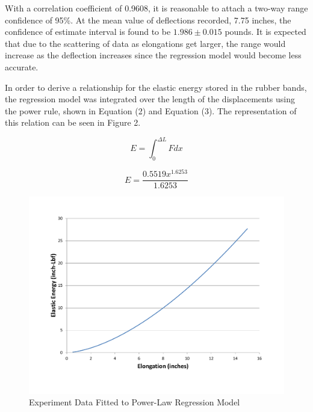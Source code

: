 \documentclass[12pt]{article}
\begin{document}
\bigskip
With a correlation coefficient of 0.9608, it is reasonable to attach a two-way range confidence of 95\%. At the mean value of deflections recorded, 7.75 inches, the confidence of estimate interval is found to be $1.986 \pm 0.015$ pounds. It is expected that due to the scattering of data as elongations get larger, the range would increase as the deflection increases since the regression model would become less accurate.
\bigskip

In order to derive a relationship for the elastic energy stored in the rubber bands, the regression model was integrated over the length of the displacements using the power rule, shown in Equation (2) and Equation (3). The representation of this relation can be seen in Figure 2.
\bigskip

\begin{equation}
E = \int_{0}^{\Delta L}Fdx
\end{equation}

\bigskip

\begin{equation}
E = \frac{0.5519x^{1.6253}}{1.6253}
\end{equation}

\newpage

\begin{figure}[t!] %
   \centering
   \includegraphics[width=\linewidth]{elastic_energy.pdf} 
   \caption{Experiment Data Fitted to Power-Law Regression Model}
   \label{fig:example}
\end{figure}
\end{document}
